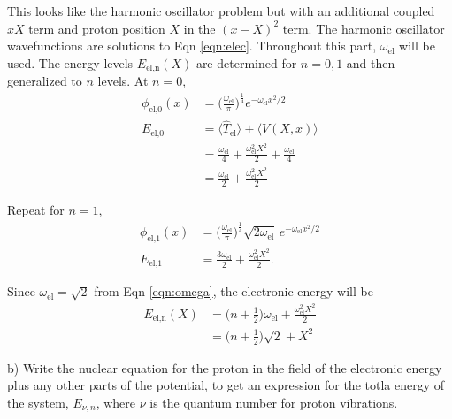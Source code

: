 \documentclass{article}
\begin{document}
{This looks like the harmonic oscillator problem but with an additional
coupled $xX$ term and proton position $X$ in the $(x-X)^2$ term.
The harmonic oscillator wavefunctions are solutions to Eqn \eqref{eqn:elec}.
Throughout this part, $\omega_{\text{el}}$ will be used. The energy levels
$E_{\text{el,n}}(X)$ are determined for $n=0,1$ and then generalized to $n$
levels. At $n=0$,
\begin{align}
  \phi_{\text{el,0}}(x) & = \Big(\frac{\omega_{\text{el}}}{\pi}\Big)^{\frac{1}{4}}
  e^{-\omega_{\text{el}}x^2/2} \\
  E_{\text{el,0}} & = \langle \hat{T}_{\text{el}}\rangle + \langle V(X,x) \rangle \nonumber \\
  & = \frac{\omega_{\text{el}}}{4} + \frac{\omega_{\text{el}}^2X^2}{2}
  + \frac{\omega_{\text{el}}}{4}\nonumber \\
  & = \frac{\omega_{\text{el}}}{2} + \frac{\omega_{\text{el}}^2X^2}{2}
\end{align}

Repeat for $n=1$,
\begin{align}
  \phi_{\text{el,1}}(x) & = \Bigg(\frac{\omega_{\text{el}}}{\pi}\Bigg)^{\frac{1}{4}}
  \sqrt{2\omega_{\text{el}}}\,e^{-\omega_{\text{el}}x^2/2} \\
  E_{\text{el,1}} & = \frac{3\omega_{\text{el}}}{2} +\frac{\omega_{\text{el}}^2X^2}{2}.
\end{align}

Since $\omega_{\text{el}}=\sqrt{2}$ from Eqn \eqref{eqn:omega}, the electronic
energy will be
\begin{align}
  E_{\text{el,n}}(X) & =\Bigg(n+\frac{1}{2}\Bigg)\omega_{\text{el}}
  + \frac{\omega_{\text{el}}^2X^2}{2} \nonumber \\
  & = \Bigg(n+\frac{1}{2}\Bigg)\sqrt{2} + X^2
\end{align}
}

\noindent b) Write the nuclear equation for the proton in the field of the
electronic energy plus any other parts of the potential, to get an expression
for the totla energy of the system, $E_{\nu,n}$, where $\nu$ is the quantum
number for proton vibrations.
\\
\end{document}
